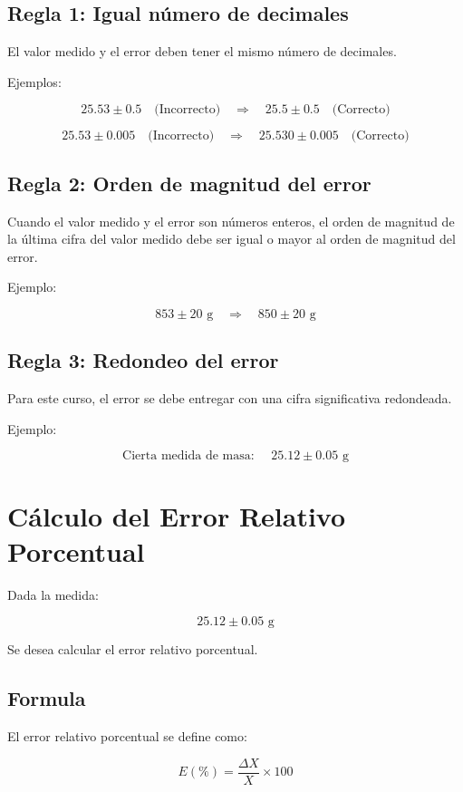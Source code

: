 \subsection{Regla 1: Igual número de decimales}
El valor medido y el error deben tener el mismo número de decimales. 

Ejemplos:

\[
25.53 \pm 0.5 \quad \text{(Incorrecto)} \quad \Rightarrow \quad 25.5 \pm 0.5 \quad \text{(Correcto)}
\]

\[
25.53 \pm 0.005 \quad \text{(Incorrecto)} \quad \Rightarrow \quad 25.530 \pm 0.005 \quad \text{(Correcto)}
\]

\subsection{Regla 2: Orden de magnitud del error}
Cuando el valor medido y el error son números enteros, el orden de magnitud de la última cifra del valor medido debe ser igual o mayor al orden de magnitud del error.

Ejemplo:

\[
853 \pm 20 \text{ g} \quad \Rightarrow \quad 850 \pm 20 \text{ g}
\]

\subsection{Regla 3: Redondeo del error}
Para este curso, el error se debe entregar con una cifra significativa redondeada.

Ejemplo:

\[
\text{Cierta medida de masa: } \quad 25.12 \pm 0.05 \text{ g}
\]

\newpage
\section{Cálculo del Error Relativo Porcentual}

Dada la medida:

\[
25.12 \pm 0.05 \text{ g}
\]

Se desea calcular el error relativo porcentual.

\subsection{Formula}

El error relativo porcentual se define como:

\[
E (\%) = \frac{\Delta X}{X} \times 100
\]

